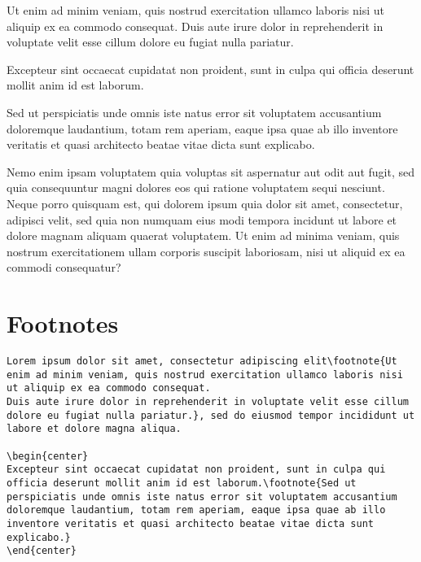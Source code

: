 \begin{flushleft}
Ut enim ad minim veniam, quis nostrud exercitation ullamco laboris nisi ut aliquip ex ea commodo consequat.
Duis aute irure dolor in reprehenderit in voluptate velit esse cillum dolore eu fugiat nulla pariatur.
\end{flushleft}

\begin{center}
Excepteur sint occaecat cupidatat non proident, sunt in culpa qui officia deserunt mollit anim id est laborum.
\end{center}

\begin{flushright}
Sed ut perspiciatis unde omnis iste natus error sit voluptatem accusantium doloremque laudantium, totam rem aperiam, eaque ipsa quae ab illo inventore veritatis et quasi architecto beatae vitae dicta sunt explicabo.
\end{flushright}

Nemo enim ipsam voluptatem quia voluptas sit aspernatur aut odit aut fugit, sed quia consequuntur magni dolores eos qui ratione voluptatem sequi nesciunt.
\ccPar%
Neque porro quisquam est, qui dolorem ipsum quia dolor sit amet, consectetur, adipisci velit, sed quia non numquam eius modi tempora incidunt ut labore et dolore magnam aliquam quaerat voluptatem.
\ccPar%
Ut enim ad minima veniam, quis nostrum exercitationem ullam corporis suscipit laboriosam, nisi ut aliquid ex ea commodi consequatur?

\section*{Footnotes}%
\label{sec:footnotes}

\begin{lstlisting}[caption={Some footnotes.}]
Lorem ipsum dolor sit amet, consectetur adipiscing elit\footnote{Ut enim ad minim veniam, quis nostrud exercitation ullamco laboris nisi ut aliquip ex ea commodo consequat.
Duis aute irure dolor in reprehenderit in voluptate velit esse cillum dolore eu fugiat nulla pariatur.}, sed do eiusmod tempor incididunt ut labore et dolore magna aliqua.

\begin{center}
Excepteur sint occaecat cupidatat non proident, sunt in culpa qui officia deserunt mollit anim id est laborum.\footnote{Sed ut perspiciatis unde omnis iste natus error sit voluptatem accusantium doloremque laudantium, totam rem aperiam, eaque ipsa quae ab illo inventore veritatis et quasi architecto beatae vitae dicta sunt explicabo.}
\end{center}
\end{lstlisting}


